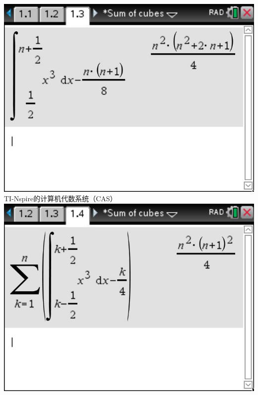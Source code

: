 \documentclass[aspectratio=169]{beamer}
\begin{document}
\begin{frame}
\begin{columns}
       	\includegraphics[scale=0.22]{积分运算2.jpg}\\
       	\scriptsize {TI-Nspire的计算机代数系统（CAS）}\\
       	\hspace{1cm}
       	\includegraphics[scale=0.22]{积分运算3.jpg}\\
       \scriptsize {\phantom{TI-Nspire的计算机代数系统（CAS）}}\\
       	\hspace{1cm}
       \end{columns}            
   \end{frame}
\end{document}
